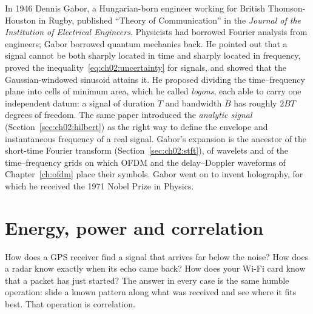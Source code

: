 \begin{history}
In 1946 Dennis Gabor, a Hungarian-born engineer working for British Thomson-Houston in Rugby,
published ``Theory of Communication'' in the \emph{Journal of the Institution of Electrical
Engineers}. Physicists had borrowed Fourier analysis from engineers; Gabor borrowed quantum
mechanics back. He pointed out that a signal cannot be both sharply located in time and sharply
located in frequency, proved the inequality~\eqref{eq:ch02:uncertainty} for signals, and showed
that the Gaussian-windowed sinusoid attains it. He proposed dividing the time--frequency plane into
cells of minimum area, which he called \emph{logons}, each able to carry one independent datum: a
signal of duration $T$ and bandwidth $B$ has roughly $2BT$ degrees of freedom. The same paper
introduced the \emph{analytic signal} (Section~\ref{sec:ch02:hilbert}) as the right way to define
the envelope and instantaneous frequency of a real signal. Gabor's expansion is the ancestor of the
short-time Fourier transform (Section~\ref{sec:ch02:stft}), of wavelets and of the time--frequency
grids on which OFDM and the delay--Doppler waveforms of Chapter~\ref{ch:ofdm} place their symbols.
Gabor went on to invent holography, for which he received the 1971 Nobel Prize in Physics.
\end{history}

\section{Energy, power and correlation}
\label{sec:ch02:correlation}

How does a GPS receiver find a signal that arrives far below the noise? How does a radar know
exactly when its echo came back? How does your Wi-Fi card know that a packet has just started? The
answer in every case is the same humble operation: slide a known pattern along what was received
and see where it fits best. That operation is correlation.



